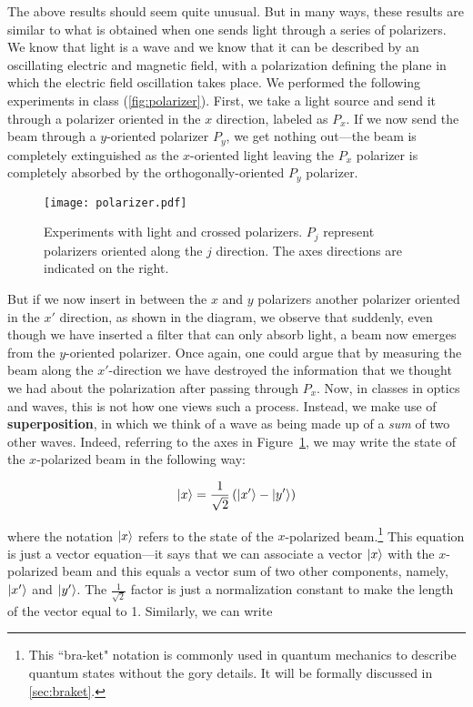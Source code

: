 The above results should seem quite unusual. 
But in many ways, these results are similar to what is obtained when one sends light through a series of polarizers. 
We know that light is a wave and we know that it can be described by an oscillating electric and magnetic field, with a polarization defining the plane in which the electric field oscillation takes place. 
We performed the following experiments in class (\autoref{fig:polarizer}).
First, we take a light source and send it through a polarizer oriented in the $x$ direction, labeled as $P_x$. 
If we now send the beam through a $y$-oriented polarizer $P_y$, we get nothing out---the beam is completely extinguished as the $x$-oriented light leaving the $P_x$ polarizer is completely absorbed by the orthogonally-oriented $P_y$ polarizer.

\begin{figure}[!h]
	\centering
	\texttt{[image: polarizer.pdf]}
	\caption{Experiments with light and crossed polarizers. 
	$P_j$ represent polarizers oriented along the $j$ direction. 
	The axes directions are indicated on the right.}
	\label{fig:polarizer}
\end{figure}

But if we now insert in between the $x$ and $y$ polarizers another polarizer oriented in the $x'$ direction, as shown in the diagram, we observe that suddenly, even though we have inserted a filter that can only absorb light, a beam now emerges from the $y$-oriented polarizer. 
Once again, one could argue that by measuring the beam along the $x'$-direction we have destroyed the information that we thought we had about the polarization after passing through $P_x$. 
Now, in classes in optics and waves, this is not how one views such a process. 
Instead, we make use of \textbf{superposition}, in which we think of a wave as being made up of a \emph{sum} of two other waves. 
Indeed, referring to the axes in Figure~\ref{fig:polarizer}, we may write the state of the $x$-polarized beam in the following way:

\begin{equation}
	\ket{x} = \frac{1}{\sqrt{2}} \left( \ket{x'} - \ket{y'} \right) \label{eq:sup-polar}
\end{equation}

\noindent where the notation $\ket{x}$ refers to the state of the $x$-polarized beam.\footnote{This ``bra-ket" notation is commonly used in quantum mechanics to describe quantum states without the gory details. It will be formally discussed in \autoref{sec:braket}.} 
This equation is just a vector equation---it says that we can associate a vector $\ket{x}$ with the $x$-polarized beam and this equals a vector sum of two other components, namely, $\ket{x'}$ and $\ket{y'}$. 
The $\frac{1}{\sqrt{2}}$ factor is just a normalization constant to make the length of the vector equal to 1. 
Similarly, we can write

